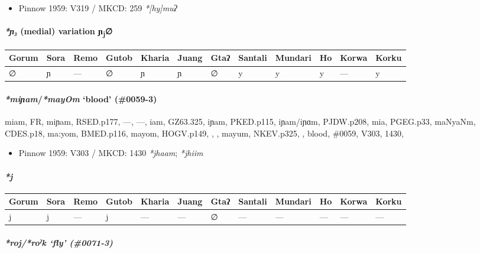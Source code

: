 \documentclass[a4paper,]{article}
\providecommand{\tightlist}{%
  \setlength{\itemsep}{0pt}\setlength{\parskip}{0pt}}
\let\oldparagraph\paragraph
\renewcommand{\paragraph}[1]{\oldparagraph{#1}\mbox{}}
\let\oldsubparagraph\subparagraph
\renewcommand{\subparagraph}[1]{\oldsubparagraph{#1}\mbox{}}
\begin{document}
\begin{itemize}
\tightlist
\item
  Pinnow 1959: V319 / MKCD: 259 \emph{*{[}hy{]}muʔ}
\end{itemize}

\paragraph{\texorpdfstring{\emph{*ɲ₃} (medial) variation
ɲ\textsubscript{j}∅}{*ɲ₃ (medial) variation ɲj∅}}\label{ux272-medial-variation-ux272j}

\begin{longtable}[]{@{}llllllllllll@{}}
\toprule
Gorum & Sora & Remo & Gutob & Kharia & Juang & Gtaʔ & Santali & Mundari
& Ho & Korwa & Korku\tabularnewline
\midrule
\endhead
∅ & ɲ & --- & ∅ & ɲ & ɲ & ∅ & y & y & y & --- & y\tabularnewline
\bottomrule
\end{longtable}

\paragraph{\texorpdfstring{\emph{*miɲam}/\emph{*mayOm} `blood'
(\#0059-3)}{*miɲam/*mayOm blood (\#0059-3)}}\label{miux272ammayom-blood-0059-3}

miam, FR, miɲam, RSED.p177, ---, ---, iam, GZ63.325, iɲam, PKED.p115,
iɲam/iɲɑm, PJDW.p208, mia, PGEG.p33, maNyaNm, CDES.p18, ma:yom,
BMED.p116, mayom, HOGV.p149, , , mayum, NKEV.p325, , blood, \#0059,
V303, 1430,

\begin{itemize}
\tightlist
\item
  Pinnow 1959: V303 / MKCD: 1430 \emph{*jhaam}; \emph{*jhiim}
\end{itemize}

\paragraph{\texorpdfstring{\emph{*j}}{*j}}\label{j}

\begin{longtable}[]{@{}llllllllllll@{}}
\toprule
Gorum & Sora & Remo & Gutob & Kharia & Juang & Gtaʔ & Santali & Mundari
& Ho & Korwa & Korku\tabularnewline
\midrule
\endhead
j & j & --- & j & --- & --- & ∅ & --- & --- & --- & --- &
---\tabularnewline
\bottomrule
\end{longtable}

\subparagraph{\texorpdfstring{\emph{*roj}/\emph{*roˀk} `fly'
(\#0071-3)}{*roj/*roˀk fly (\#0071-3)}}\label{rojroux2c0k-fly-0071-3}
\end{document}
